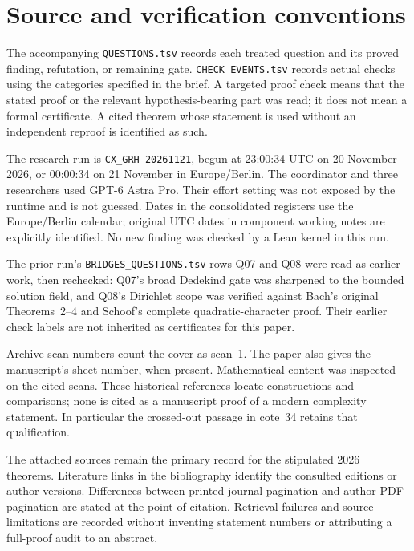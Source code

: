 \documentclass[11pt,a4paper]{article}
\begin{document}
\section{Source and verification conventions}
\label{sec:source-conventions}

The accompanying \texttt{QUESTIONS.tsv} records each treated question
and its proved finding, refutation, or remaining gate.
\texttt{CHECK\_EVENTS.tsv} records actual checks using the categories
specified in the brief. A targeted proof check means that the stated
proof or the relevant hypothesis-bearing part was read; it does not
mean a formal certificate. A cited theorem whose statement is used
without an independent reproof is identified as such.

The research run is \texttt{CX\_GRH-20261121}, begun at
23:00:34 UTC on 20 November 2026, or 00:00:34 on 21 November in
Europe/Berlin. The coordinator and three researchers used
GPT-6 Astra Pro. Their effort setting was not exposed by the runtime
and is not guessed. Dates in the consolidated registers use the
Europe/Berlin calendar; original UTC dates in component working notes
are explicitly identified. No new finding was checked by a Lean
kernel in this run.

The prior run's \texttt{BRIDGES\_QUESTIONS.tsv} rows Q07 and Q08
were read as earlier work, then rechecked: Q07's broad Dedekind gate
was sharpened to the bounded solution field, and Q08's Dirichlet
scope was verified against Bach's original Theorems~2--4 and
Schoof's complete quadratic-character proof. Their earlier check
labels are not inherited as certificates for this paper.

Archive scan numbers count the cover as scan~1. The paper also gives
the manuscript's sheet number, when present. Mathematical content
was inspected on the cited scans. These historical references locate
constructions and comparisons; none is cited as a manuscript proof
of a modern complexity statement. In particular the crossed-out
passage in cote~34 retains that qualification.

The attached sources remain the primary record for the stipulated
2026 theorems. Literature links in the bibliography identify the
consulted editions or author versions. Differences between printed
journal pagination and author-PDF pagination are stated at the
point of citation. Retrieval failures and source limitations are
recorded without inventing statement numbers or attributing a
full-proof audit to an abstract.
\end{document}
